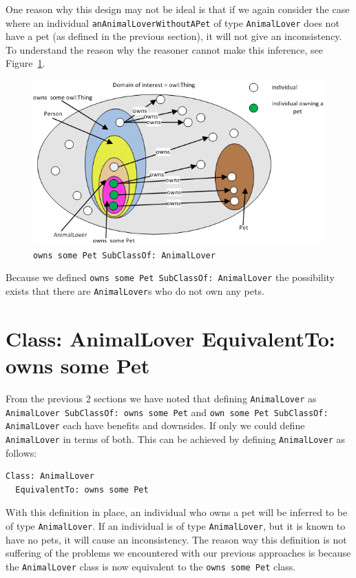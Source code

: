 \documentclass{amsart}
\begin{document}
One reason why this design may not be ideal is that if we again consider the case where an individual \texttt{anAnimalLoverWithoutAPet} of type \texttt{AnimalLover} does not have a pet (as defined in the previous section), it will not give an inconsistency. 
To understand the reason why the reasoner cannot make this inference, see Figure~\ref{fig_OwnsSomePetSubclassAnimalLover}.
    \begin{figure}
      \centering \includegraphics[trim = 0mm 0mm 0mm 0mm, clip, scale=0.6]{./OwnsSomePetSubclassAnimalLover.png}
      \caption{\texttt{owns some Pet SubClassOf: AnimalLover}}\label{fig_OwnsSomePetSubclassAnimalLover}
    \end{figure} 
Because we defined \texttt{owns some Pet SubClassOf: AnimalLover} the possibility exists that there are \texttt{AnimalLover}s who do not own any pets.

  \section{Class: AnimalLover EquivalentTo: owns some Pet}
 From the previous 2 sections we have noted that defining \texttt{AnimalLover} as \texttt{AnimalLover SubClassOf: owns some Pet} and 
 \texttt{own some Pet SubClassOf: AnimalLover} each have benefits and downsides. If only we could define \texttt{AnimalLover} in terms of both. This can be achieved by defining \texttt{AnimalLover} as follows:
\begin{small}
\begin{verbatim} 
Class: AnimalLover
  EquivalentTo: owns some Pet
\end{verbatim}
\end{small}  
With this definition in place, an individual who owns a pet will be inferred to be of type \texttt{AnimalLover}. If an individual is of type \texttt{AnimalLover}, but it is known to have no pets, it will cause an inconsistency. The reason way this definition is not suffering of the problems we encountered with our previous approaches is because the \texttt{AnimalLover} class is now equivalent to the  \texttt{owns some Pet} class.
\end{document}
